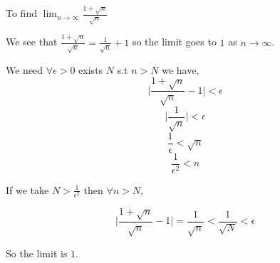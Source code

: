 \begin{eg}
    To find $\lim_{n \to \infty} \frac{1 + \sqrt{n}}{\sqrt{n}}$

    \vspace{1em}

    We see that $\frac{1 + \sqrt{n}}{\sqrt{n}} = \frac{1}{\sqrt{n}} + 1$ so the limit goes to $1$ as $n \to \infty$.


    \begin{swork}[6cm]
        We need $\forall \epsilon > 0$ exists $N$ s.t $n > N$ we have,  
        $$ \bigg | \frac{1 + \sqrt{n}}{\sqrt{n}} - 1 \bigg | < \epsilon$$
        $$ \bigg | \frac{1}{\sqrt{n}} \bigg | < \epsilon$$
        $$  \frac{1}{\epsilon}  < \sqrt{n}$$
        $$  \frac{1}{\epsilon^2}  < n$$
    \end{swork}


    If we take $N > \frac{1}{\epsilon^2}$ then $\forall n > N$,  

    $$ \bigg | \frac{1 + \sqrt{n}}{\sqrt{n}} - 1 \bigg | = \frac{1}{\sqrt{n}} < \frac{1}{\sqrt{N}} < \epsilon$$

    So the limit is $1$.
\end{eg}

